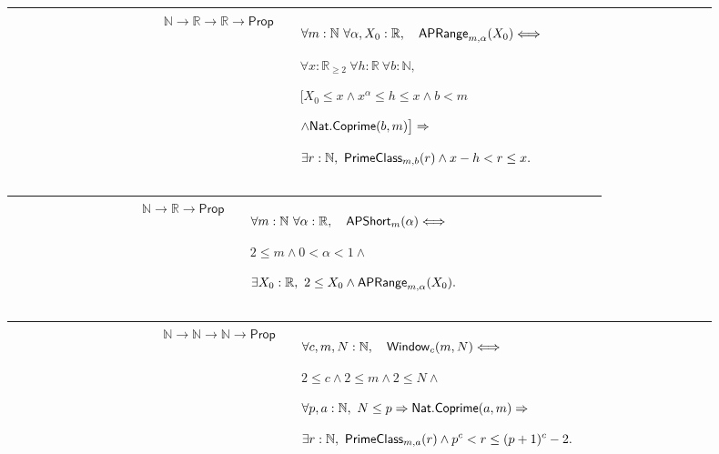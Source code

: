 \documentclass[12pt,reqno]{amsart}
\theoremstyle{blueplain}
\numberwithin{equation}{section}
\begin{document}
{\scriptsize \setlength{\parskip}{0pt}\nointerlineskip
\noindent 
\begin{tabular}{|@{}>{\centering\arraybackslash}m{0.19251\linewidth}|>{\centering\arraybackslash}m{0.16845\linewidth}|>{\centering\arraybackslash}m{0.53904\linewidth}|}
\hline
{\hypertarget{def:APRange}{$\mathsf{APRange}$}} & {$\mathbb{N}\to\mathbb{R}%
\to\mathbb{R}\to\mathsf{Prop}$} & {$\displaystyle \forall m:\mathbb{N}\
\forall\alpha,X_0:\mathbb{R},\quad \hyperlink{def:APRange}{\mathsf{APRange} }%
_{m,\alpha}(X_0)\Longleftrightarrow$ \par$\displaystyle \forall x:\mathbb{R}%
_{\ge2}\ \forall h:\mathbb{R}\ \forall b:\mathbb{N},$ \par$\displaystyle %
\bigl[X_0\le x\wedge x^\alpha\le h\le x\wedge b<m$ \par$\displaystyle \wedge 
\hyperlink{def:Nat.Coprime}{\mathsf{Nat.Coprime} }(b,m)\bigr]\Rightarrow$ %
\par$\displaystyle \exists r:\mathbb{N},\ \hyperlink{def:PrimeClass}{\mathsf{%
PrimeClass} }_{m,b}(r)\wedge x-h<r\le x.$} \\ \hline
\end{tabular}%
}

{\scriptsize \setlength{\parskip}{0pt}\nointerlineskip
\noindent 
\begin{tabular}{|@{}>{\centering\arraybackslash}m{0.19251\linewidth}|>{\centering\arraybackslash}m{0.16845\linewidth}|>{\centering\arraybackslash}m{0.53904\linewidth}|}
\hline
{\hypertarget{def:APShort}{$\mathsf{APShort}$}} & {$\mathbb{N}\to\mathbb{R}%
\to\mathsf{Prop}$} & {$\displaystyle \forall m:\mathbb{N}\ \forall\alpha:%
\mathbb{R},\quad \hyperlink{def:APShort}{\mathsf{APShort} }%
_m(\alpha)\Longleftrightarrow$ \par$\displaystyle 2\le
m\wedge0<\alpha<1\wedge$ \par$\displaystyle \exists X_0:\mathbb{R},\ 2\le
X_0\wedge \hyperlink{def:APRange}{\mathsf{APRange} }_{m,\alpha}(X_0).$} \\ 
\hline
\end{tabular}%
}

{\scriptsize \setlength{\parskip}{0pt}\nointerlineskip
\noindent 
\begin{tabular}{|@{}>{\centering\arraybackslash}m{0.19251\linewidth}|>{\centering\arraybackslash}m{0.16845\linewidth}|>{\centering\arraybackslash}m{0.53904\linewidth}|}
\hline
{\hypertarget{def:Window}{$\mathsf{Window}$}} & {$\mathbb{N}\to\mathbb{N}\to%
\mathbb{N}\to\mathsf{Prop}$} & {$\displaystyle \forall c,m,N:\mathbb{N}%
,\quad \hyperlink{def:Window}{\mathsf{Window} }_c(m,N)\Longleftrightarrow$ %
\par$\displaystyle 2\le c\wedge2\le m\wedge2\le N\wedge$ \par$\displaystyle %
\forall p,a:\mathbb{N},\ N\le p\Rightarrow \hyperlink{def:Nat.Coprime}{%
\mathsf{Nat.Coprime} }(a,m)\Rightarrow$ \par$\displaystyle \exists r:\mathbb{%
N},\ \hyperlink{def:PrimeClass}{\mathsf{PrimeClass} }_{m,a}(r)\wedge
p^c<r\le(p+1)^c-2.$} \\ \hline
\end{tabular}%
}
\end{document}
